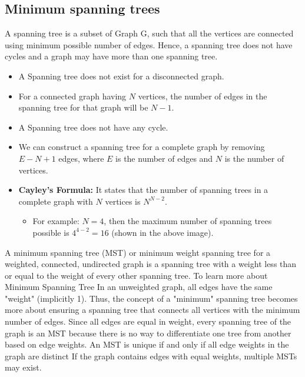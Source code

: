\documentclass{report}
\begin{document}
\subsection{Minimum spanning trees}
\bigbreak \noindent 
A spanning tree is a subset of Graph G, such that all the vertices are connected using minimum possible number of edges. Hence, a spanning tree does not have cycles and a graph may have more than one spanning tree.
\begin{itemize}
    \item A Spanning tree does not exist for a disconnected graph.
    \item For a connected graph having \(N\) vertices, the number of edges in the spanning tree for that graph will be \(N-1\).
    \item A Spanning tree does not have any cycle.
    \item We can construct a spanning tree for a complete graph by removing \(E-N+1\) edges, where \(E\) is the number of edges and \(N\) is the number of vertices.
    \item \textbf{Cayley's Formula:} It states that the number of spanning trees in a complete graph with \(N\) vertices is \(N^{N-2}\).
    \begin{itemize}
        \item For example: \(N=4\), then the maximum number of spanning trees possible is \(4^{4-2} = 16\) (shown in the above image).
    \end{itemize}
\end{itemize}
\bigbreak \noindent 
A minimum spanning tree (MST) or minimum weight spanning tree for a weighted, connected, undirected graph is a spanning tree with a weight less than or equal to the weight of every other spanning tree. To learn more about Minimum Spanning Tree
\bigbreak \noindent 
In an unweighted graph, all edges have the same "weight" (implicitly 1). Thus, the concept of a "minimum" spanning tree becomes more about ensuring a spanning tree that connects all vertices with the minimum number of edges.
\bigbreak \noindent 
Since all edges are equal in weight, every spanning tree of the graph is an MST because there is no way to differentiate one tree from another based on edge weights.
\bigbreak \noindent 
An MST is unique if and only if all edge weights in the graph are distinct
\bigbreak \noindent 
If the graph contains edges with equal weights, multiple MSTs may exist.

\bigbreak \noindent 
\end{document}
